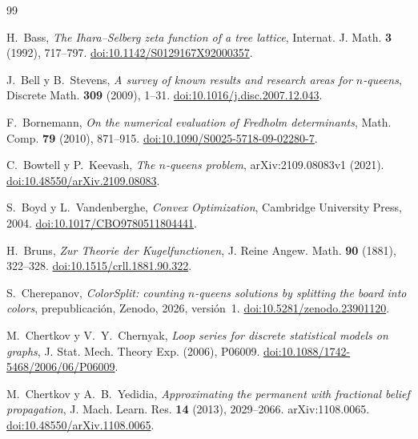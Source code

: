 \renewcommand*{\refname}{\phantomsection Referencias}
\begin{thebibliography}{99}
\raggedright

 H.~Bass, \emph{The Ihara--Selberg zeta function of a tree lattice}, Internat. J.
Math. \textbf{3} (1992), 717--797.
\href{https://doi.org/10.1142/S0129167X92000357}{doi:10.1142/S0129167X92000357}.

 J.~Bell y B.~Stevens, \emph{A survey of known results and research areas
for $n$-queens}, Discrete Math. \textbf{309} (2009), 1--31.
\href{https://doi.org/10.1016/j.disc.2007.12.043}{doi:10.1016/j.disc.2007.12.043}.

 F.~Bornemann, \emph{On the numerical evaluation of Fredholm determinants}, Math.
Comp. \textbf{79} (2010), 871--915.
\href{https://doi.org/10.1090/S0025-5718-09-02280-7}{doi:10.1090/S0025-5718-09-02280-7}.

 C.~Bowtell y P.~Keevash, \emph{The $n$-queens problem}, arXiv:2109.08083v1 (2021).
\href{https://doi.org/10.48550/arXiv.2109.08083}{doi:10.48550/arXiv.2109.08083}.

 S.~Boyd y L.~Vandenberghe, \emph{Convex Optimization}, Cambridge University Press, 2004.
\href{https://doi.org/10.1017/CBO9780511804441}{doi:10.1017/CBO9780511804441}.

 H.~Bruns, \emph{Zur Theorie der Kugelfunctionen}, J. Reine Angew. Math. \textbf{90}
(1881), 322--328.
\href{https://doi.org/10.1515/crll.1881.90.322}{doi:10.1515/crll.1881.90.322}.

 S.~Cherepanov, \emph{ColorSplit: counting $n$-queens solutions by splitting the
board into colors}, prepublicación, Zenodo, 2026, versión~1.
\href{https://doi.org/10.5281/zenodo.23901120}{doi:10.5281/zenodo.23901120}.

 M.~Chertkov y V.~Y.~Chernyak, \emph{Loop series for discrete statistical models on
graphs}, J. Stat. Mech. Theory Exp. (2006), P06009.
\href{https://doi.org/10.1088/1742-5468/2006/06/P06009}{doi:10.1088/1742-5468/2006/06/P06009}.

 M.~Chertkov y A.~B.~Yedidia, \emph{Approximating the permanent with
fractional belief propagation}, J. Mach. Learn. Res. \textbf{14} (2013), 2029--2066.
arXiv:1108.0065. \href{https://doi.org/10.48550/arXiv.1108.0065}{doi:10.48550/arXiv.1108.0065}.


\end{thebibliography}
